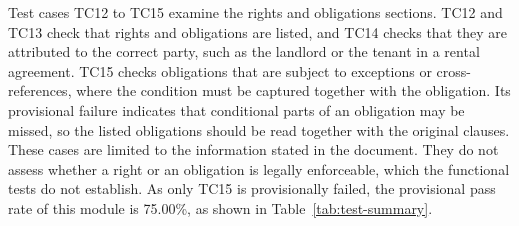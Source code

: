 \documentclass[12pt,a4paper,oneside]{report}
\begin{document}
Test cases TC12 to TC15 examine the rights and obligations sections. TC12 and TC13 check that rights and obligations are listed, and TC14 checks that they are attributed to the correct party, such as the landlord or the tenant in a rental agreement. TC15 checks obligations that are subject to exceptions or cross-references, where the condition must be captured together with the obligation. Its provisional failure indicates that conditional parts of an obligation may be missed, so the listed obligations should be read together with the original clauses. These cases are limited to the information stated in the document. They do not assess whether a right or an obligation is legally enforceable, which the functional tests do not establish. As only TC15 is provisionally failed, the provisional pass rate of this module is 75.00\%, as shown in Table~\ref{tab:test-summary}.
\end{document}
